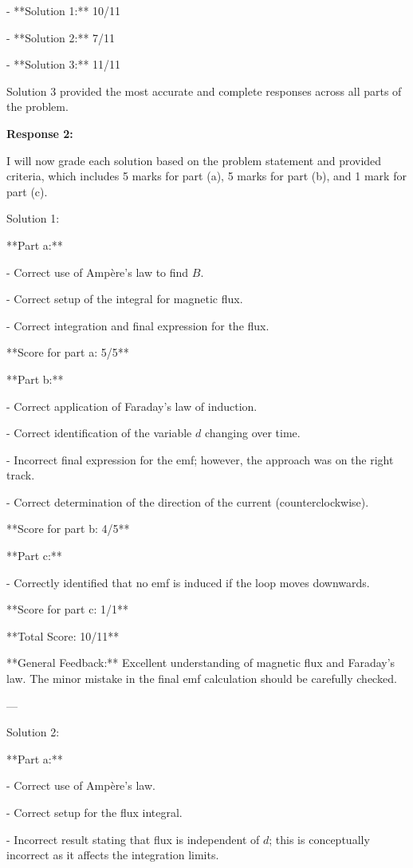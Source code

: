 \documentclass[a4paper,11pt]{article}
\begin{document}
- **Solution 1:** 10/11

- **Solution 2:** 7/11

- **Solution 3:** 11/11

Solution 3 provided the most accurate and complete responses across all parts of the problem.

\bigskip
\textbf{Response 2:}


I will now grade each solution based on the problem statement and provided criteria, which includes 5 marks for part (a), 5 marks for part (b), and 1 mark for part (c). 

Solution 1:

**Part a:**

- Correct use of Ampère's law to find \( B \).

- Correct setup of the integral for magnetic flux.

- Correct integration and final expression for the flux.

**Score for part a: 5/5**

**Part b:**

- Correct application of Faraday's law of induction.

- Correct identification of the variable \( d \) changing over time.

- Incorrect final expression for the emf; however, the approach was on the right track.

- Correct determination of the direction of the current (counterclockwise).

**Score for part b: 4/5**

**Part c:**

- Correctly identified that no emf is induced if the loop moves downwards.

**Score for part c: 1/1**

**Total Score: 10/11**

**General Feedback:** Excellent understanding of magnetic flux and Faraday's law. The minor mistake in the final emf calculation should be carefully checked.

---

Solution 2:

**Part a:**

- Correct use of Ampère's law.

- Correct setup for the flux integral.

- Incorrect result stating that flux is independent of \( d \); this is conceptually incorrect as it affects the integration limits.
\end{document}
